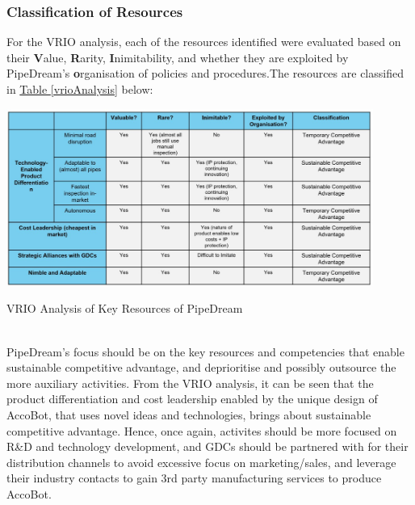 \documentclass[11pt]{article}		%
\newcommand{\tableref}[1]{\hyperref[#1]{Table \ref*{#1}}}     %
\begin{document}
	
	\subsubsection{Classification of Resources}
	
    For the VRIO analysis, each of the resources identified were evaluated based on their \textbf{V}alue, \textbf{R}arity, \textbf{I}nimitability, and whether they are exploited by PipeDream's \textbf{o}rganisation of policies and procedures.The resources are classified in \tableref{vrioAnalysis} below: 
                \begin{table}[h]
					\centering
					\includegraphics[width=0.9\textwidth]{VRIO.jpg}
					\caption{VRIO Analysis of Key Resources of PipeDream}
					\label{vrioAnalysis}
			    \end{table}
	\\ 
	\hspace*{2ex} PipeDream's focus should be on the key resources and competencies that enable sustainable competitive advantage, and deprioritise and possibly outsource the more auxiliary activities. From the VRIO analysis, it can be seen that the product differentiation and cost leadership enabled by the unique design of AccoBot, that uses novel ideas and technologies, brings about sustainable competitive advantage. Hence, once again, activites should be more focused on R\&D and technology development, and GDCs should be partnered with for their distribution channels to avoid excessive focus on marketing/sales, and leverage their industry contacts to gain 3rd party manufacturing services to produce AccoBot. 
	
\end{document}
